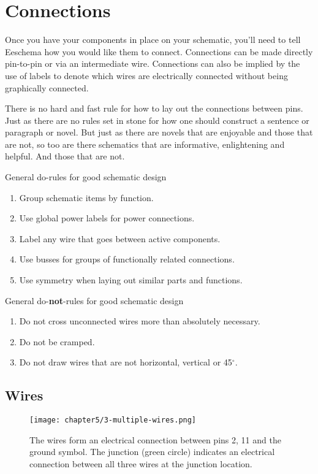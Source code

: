 \section{Connections}

Once you have your components in place on your schematic, you'll need to tell Eeschema how you would like them to connect.
Connections can be made directly pin-to-pin or via an intermediate wire.
Connections can also be implied by the use of labels to denote which wires are electrically connected without being graphically connected.

There is no hard and fast rule for how to lay out the connections between pins.
Just as there are no rules set in stone for how one should construct a sentence or paragraph or novel.
But just as there are novels that are enjoyable and those that are not, so too are there schematics that are informative, enlightening and helpful.
And those that are not.

General do-rules for good schematic design
\begin{enumerate}
\item Group schematic items by function.
\item Use global power labels for power connections.
\item Label any wire that goes between active components.
\item Use busses for groups of functionally related connections.
\item Use symmetry when laying out similar parts and functions.
\end{enumerate}

General do-\textbf{not}-rules for good schematic design
\begin{enumerate}
\item Do not cross unconnected wires more than absolutely necessary.
\item Do not be cramped.
\item Do not draw wires that are not horizontal, vertical or 45$^{\circ}$. 
\end{enumerate}

\subsection{Wires}

\begin{figure}
	\texttt{[image: chapter5/3-multiple-wires.png]}
	\caption[Wire connection between pins]
	{
		The wires form an electrical connection between pins 2, 11 and the ground symbol.
		The junction (green circle) indicates an electrical connection between all three wires at the junction location.
	}
	\label{fig:multiple-wires}
\end{figure}

